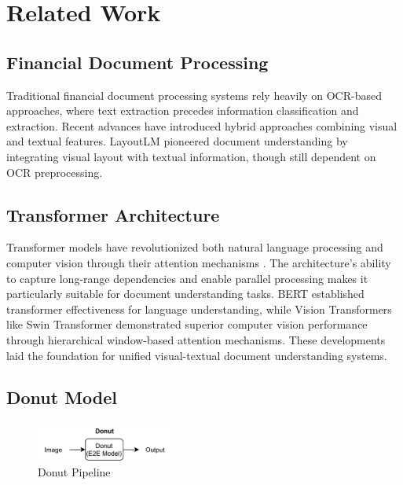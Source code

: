 \section{Related Work}

\subsection{Financial Document Processing}
Traditional financial document processing systems rely heavily on OCR-based approaches, where text extraction precedes information classification and extraction. Recent advances have introduced hybrid approaches combining visual and textual features. LayoutLM \cite{xu2020layoutlm} pioneered document understanding by integrating visual layout with textual information, though still dependent on OCR preprocessing.

\subsection{Transformer Architecture}
Transformer models have revolutionized both natural language processing and computer vision through their attention mechanisms \cite{vaswani2017attention}. The architecture's ability to capture long-range dependencies and enable parallel processing makes it particularly suitable for document understanding tasks. BERT \cite{koroteev2021bert} established transformer effectiveness for language understanding, while Vision Transformers like Swin Transformer \cite{liu2021swin} demonstrated superior computer vision performance through hierarchical window-based attention mechanisms. These developments laid the foundation for unified visual-textual document understanding systems.

\subsection{Donut Model}
\begin{figure}[htbp]
    \centerline{\includegraphics[width=0.4\textwidth]{images/donut-pipeline.png}}
    \caption{Donut Pipeline}
    \label{fig:donut_pipeline}
\end{figure}

